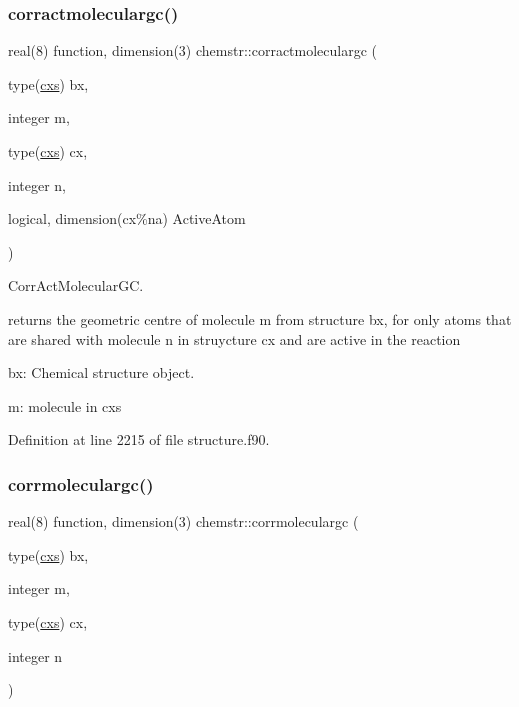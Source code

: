 \subsubsection{\texorpdfstring{corractmoleculargc()}{corractmoleculargc()}}
{\footnotesize\ttfamily real(8) function, dimension(3) chemstr\+::corractmoleculargc (\begin{DoxyParamCaption}\item[{type(\mbox{\hyperlink{structchemstr_1_1cxs}{cxs}})}]{bx,  }\item[{integer}]{m,  }\item[{type(\mbox{\hyperlink{structchemstr_1_1cxs}{cxs}})}]{cx,  }\item[{integer}]{n,  }\item[{logical, dimension(cx\%na)}]{Active\+Atom }\end{DoxyParamCaption})}



Corr\+Act\+Molecular\+GC. 

returns the geometric centre of molecule m from structure bx, for only atoms that are shared with molecule n in struycture cx and are active in the reaction


\begin{DoxyItemize}
\item bx\+: Chemical structure object.
\item m\+: molecule in cxs 
\end{DoxyItemize}

Definition at line 2215 of file structure.\+f90.

\mbox{\label{namespacechemstr_a25a9643b3e963cfdbd17379e8b2fdc40}} 
\subsubsection{\texorpdfstring{corrmoleculargc()}{corrmoleculargc()}}
{\footnotesize\ttfamily real(8) function, dimension(3) chemstr\+::corrmoleculargc (\begin{DoxyParamCaption}\item[{type(\mbox{\hyperlink{structchemstr_1_1cxs}{cxs}})}]{bx,  }\item[{integer}]{m,  }\item[{type(\mbox{\hyperlink{structchemstr_1_1cxs}{cxs}})}]{cx,  }\item[{integer}]{n }\end{DoxyParamCaption})}



